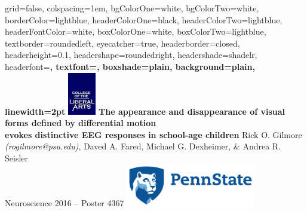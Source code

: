 \documentclass[landscape,final,paperwidth=72in,paperheight=42in,fontscale=0.285]{baposter}
\begin{document}


\begin{poster}%
  {
  grid=false,
  colspacing=1em,
  bgColorOne=white,
  bgColorTwo=white,
  borderColor=lightblue,
  headerColorOne=black,
  headerColorTwo=lightblue,
  headerFontColor=white,
  boxColorOne=white,
  boxColorTwo=lightblue,
  textborder=roundedleft,
  eyecatcher=true,
  headerborder=closed,
  headerheight=0.1\textheight,
  headershape=roundedright,
  headershade=shadelr,
  headerfont=\Large\bf\textsc, %
  textfont={\setlength{\parindent}{1.5em}},
  boxshade=plain,
  background=plain,
  linewidth=2pt
  }
  {\includegraphics[height=5em]{img/clalogo.jpg}}
  {\bf{The appearance and disappearance of visual forms defined by differential motion \\evokes distinctive EEG responses in school-age children}\vspace{0.2em}}
  {Rick O. Gilmore \emph{(rogilmore@psu.edu)}, Daved A. Fared, Michael G. Dexheimer, \& Andrea R. Seisler\\ \vspace{0.2em}
  Neuroscience 2016 -- Poster 4367}
  {\includegraphics[height=5em]{img/psu-logo-new-1000-326.jpg}}


\end{poster}
\end{document}
